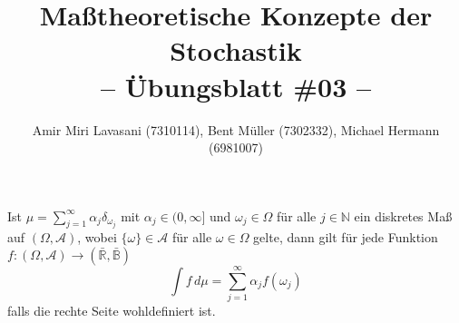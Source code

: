 \documentclass[10pt]{article}
\newenvironment{Aufgabe}[2][Aufgabe]{\begin{trivlist}
\item[\hskip \labelsep {\bfseries #1}\hskip \labelsep {\bfseries #2.}]}{\end{trivlist}}
\begin{document}
 
\title{ \textbf{Maßtheoretische Konzepte der Stochastik \\ -- Übungsblatt \#03 --} }

\author{Amir Miri Lavasani (7310114), Bent Müller (7302332),
        Michael Hermann (6981007)}
\maketitle

\begin{Aufgabe}{1} %
Ist $\mu = \sum_{j=1}^\infty \alpha_j \delta_{\omega_j}$ mit $\alpha_j \in (0, \infty]$ und $\omega_j \in \Omega$ für alle $j \in \mathbb{N}$ ein diskretes Maß auf $(\Omega, \mathcal{A})$, wobei $\{\omega \} \in \mathcal{A}$ für alle $\omega \in \Omega$ gelte, 
dann gilt für jede Funktion $f:(\Omega, \mathcal{A}) \rightarrow (\bar{\mathbb{R}}, \bar{\mathbb{B}})$
\begin{equation}
\label{eq: int}
\int f \, d\mu = \sum_{j=1}^\infty \alpha_j f(\omega_j)
\end{equation}
falls die rechte Seite wohldefiniert ist. 
\end{Aufgabe}
\end{document}
